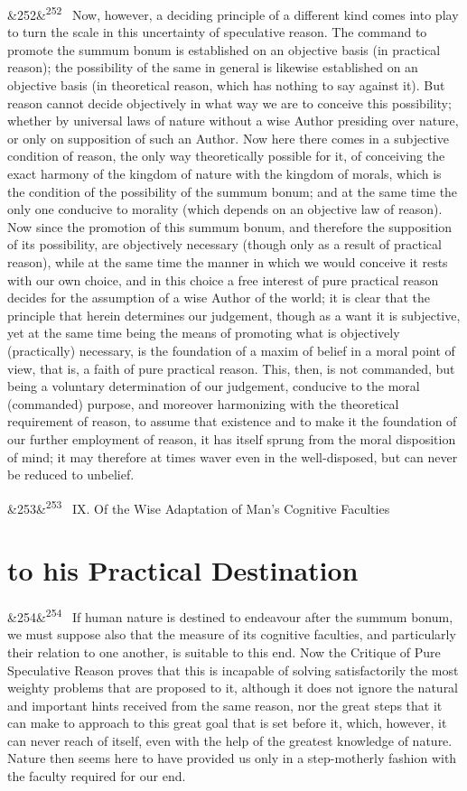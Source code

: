 \documentclass[12pt]{article}
\newcommand{\para}[1][]{\par\noindent\ifx&#1&\else\textsuperscript{\footnotesize #1}~\fi}
\begin{document}
\para[252] Now, however, a deciding principle of a different kind comes into play to turn the scale in this uncertainty of speculative reason. The command to promote the summum bonum is established on an objective basis (in practical reason); the possibility of the same in general is likewise established on an objective basis (in theoretical reason, which has nothing to say against it). But reason cannot decide objectively in what way we are to conceive this possibility; whether by universal laws of nature without a wise Author presiding over nature, or only on supposition of such an Author. Now here there comes in a subjective condition of reason, the only way theoretically possible for it, of conceiving the exact harmony of the kingdom of nature with the kingdom of morals, which is the condition of the possibility of the summum bonum; and at the same time the only one conducive to morality (which depends on an objective law of reason). Now since the promotion of this summum bonum, and therefore the supposition of its possibility, are objectively necessary (though only as a result of practical reason), while at the same time the manner in which we would conceive it rests with our own choice, and in this choice a free interest of pure practical reason decides for the assumption of a wise Author of the world; it is clear that the principle that herein determines our judgement, though as a want it is subjective, yet at the same time being the means of promoting what is objectively (practically) necessary, is the foundation of a maxim of belief in a moral point of view, that is, a faith of pure practical reason. This, then, is not commanded, but being a voluntary determination of our judgement, conducive to the moral (commanded) purpose, and moreover harmonizing with the theoretical requirement of reason, to assume that existence and to make it the foundation of our further employment of reason, it has itself sprung from the moral disposition of mind; it may therefore at times waver even in the well-disposed, but can never be reduced to unbelief.

\para[253] IX. Of the Wise Adaptation of Man's Cognitive Faculties

\section*{to his Practical Destination}

\para[254] If human nature is destined to endeavour after the summum bonum, we must suppose also that the measure of its cognitive faculties, and particularly their relation to one another, is suitable to this end. Now the Critique of Pure Speculative Reason proves that this is incapable of solving satisfactorily the most weighty problems that are proposed to it, although it does not ignore the natural and important hints received from the same reason, nor the great steps that it can make to approach to this great goal that is set before it, which, however, it can never reach of itself, even with the help of the greatest knowledge of nature. Nature then seems here to have provided us only in a step-motherly fashion with the faculty required for our end.
\end{document}
